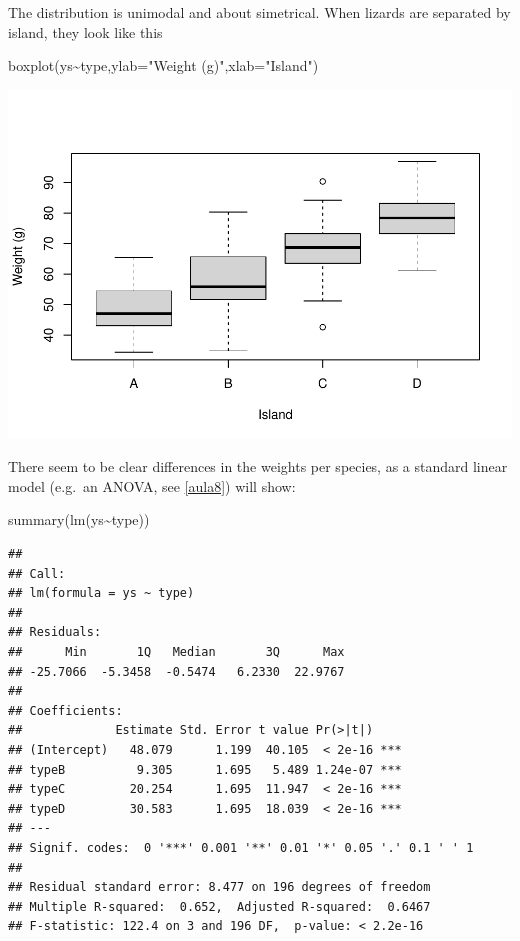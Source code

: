 \documentclass[
]{book}
\newenvironment{Shaded}{\begin{snugshade}}{\end{snugshade}}
\newcommand{\AttributeTok}[1]{\textcolor[rgb]{0.77,0.63,0.00}{#1}}
\newcommand{\FunctionTok}[1]{\textcolor[rgb]{0.00,0.00,0.00}{#1}}
\newcommand{\NormalTok}[1]{#1}
\newcommand{\SpecialCharTok}[1]{\textcolor[rgb]{0.00,0.00,0.00}{#1}}
\newcommand{\StringTok}[1]{\textcolor[rgb]{0.31,0.60,0.02}{#1}}
\begin{document}
The distribution is unimodal and about simetrical. When lizards are separated by island, they look like this

\begin{Shaded}
\begin{Highlighting}[]
\FunctionTok{boxplot}\NormalTok{(ys}\SpecialCharTok{\textasciitilde{}}\NormalTok{type,}\AttributeTok{ylab=}\StringTok{"Weight (g)"}\NormalTok{,}\AttributeTok{xlab=}\StringTok{"Island"}\NormalTok{)}
\end{Highlighting}
\end{Shaded}

\includegraphics{ECOMODbook_files/figure-latex/a10.3-1.pdf}

There seem to be clear differences in the weights per species, as a standard linear model (e.g.~an ANOVA, see \ref{aula8}) will show:

\begin{Shaded}
\begin{Highlighting}[]
\FunctionTok{summary}\NormalTok{(}\FunctionTok{lm}\NormalTok{(ys}\SpecialCharTok{\textasciitilde{}}\NormalTok{type))}
\end{Highlighting}
\end{Shaded}

\begin{verbatim}
## 
## Call:
## lm(formula = ys ~ type)
## 
## Residuals:
##      Min       1Q   Median       3Q      Max 
## -25.7066  -5.3458  -0.5474   6.2330  22.9767 
## 
## Coefficients:
##             Estimate Std. Error t value Pr(>|t|)    
## (Intercept)   48.079      1.199  40.105  < 2e-16 ***
## typeB          9.305      1.695   5.489 1.24e-07 ***
## typeC         20.254      1.695  11.947  < 2e-16 ***
## typeD         30.583      1.695  18.039  < 2e-16 ***
## ---
## Signif. codes:  0 '***' 0.001 '**' 0.01 '*' 0.05 '.' 0.1 ' ' 1
## 
## Residual standard error: 8.477 on 196 degrees of freedom
## Multiple R-squared:  0.652,  Adjusted R-squared:  0.6467 
## F-statistic: 122.4 on 3 and 196 DF,  p-value: < 2.2e-16
\end{verbatim}
\end{document}

